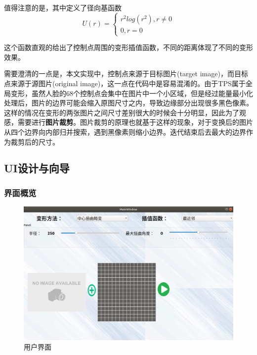 \documentclass[UTF8]{ctexart}
\begin{document}
值得注意的是，其中定义了径向基函数$$U(r)=\begin{cases}
    r^2log(r^2),r\neq0\\
    0,r=0
\end{cases}
$$

这个函数直观的给出了控制点周围的变形插值函数，不同的距离体现了不同的变形效果。

需要澄清的一点是，本文实现中，控制点来源于目标图片(target image)，而目标点来源于源图片(original image)，这一点在代码中是容易混淆的。由于TPS属于全局变形，虽然人脸的68个控制点会集中在图片中一个小区域，但是经过能量最小化处理后，图片的边界可能会缩入原图尺寸之内，导致边缘部分出现很多黑色像素。这样的情况在变形的两张图片之间尺寸差别很大的时候会十分明显，因此为了观感，需要进行\textbf{图片裁剪}。图片裁剪的原理也就基于这样的现象，对于变换后的图片从四个边界向内部归并搜索，遇到黑像素则缩小边界。迭代结束后去最大的边界作为裁剪后的尺寸。

\subsection{UI设计与向导}

\subsubsection{界面概览}
\begin{figure}[H]
    \centering
    \includegraphics[scale=0.3]{../images/report-images/manual.png}
    \caption{用户界面}
\end{figure}
\end{document}
